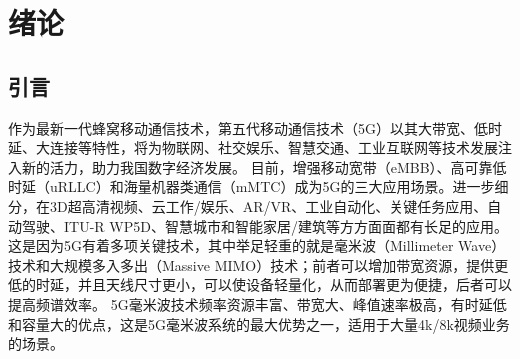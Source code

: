 \documentclass[supercite]{HustGraduPaper}
\begin{document}
\tableofcontents[indent=hustnoindent, level=3, pagenum=true]

\clearpage%

\section{绪论}

\subsection{引言}

作为最新一代蜂窝移动通信技术，第五代移动通信技术（5G）以其大带宽、低时延、大连接等特性，将为物联网、社交娱乐、智慧交通、工业互联网等技术发展注入新的活力，助力我国数字经济发展。
目前，增强移动宽带（eMBB）、高可靠低时延（uRLLC）和海量机器类通信（mMTC）成为5G的三大应用场景。进一步细分，在3D超高清视频、云工作/娱乐、AR/VR、工业自动化、关键任务应用、自动驾驶、ITU-R WP5D、智慧城市和智能家居/建筑等方方面面都有长足的应用。
这是因为5G有着多项关键技术，其中举足轻重的就是毫米波（Millimeter Wave）技术和大规模多入多出（Massive MIMO）技术；前者可以增加带宽资源，提供更低的时延，并且天线尺寸更小，可以使设备轻量化，从而部署更为便捷，后者可以提高频谱效率。
5G毫米波技术频率资源丰富、带宽大、峰值速率极高，有时延低和容量大的优点，这是5G毫米波系统的最大优势之一，适用于大量4k/8k视频业务的场景\cite{8732419}。
\end{document}
